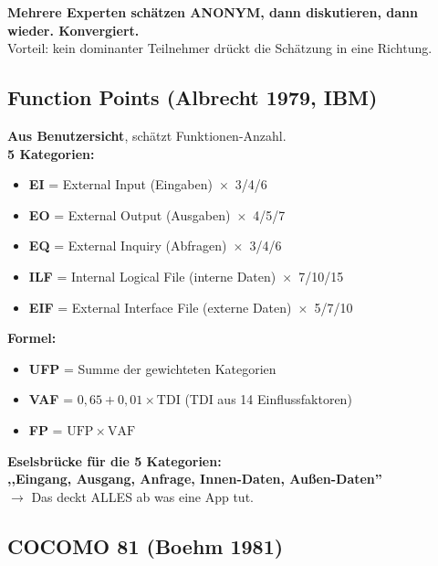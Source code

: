 \documentclass[11pt,a4paper]{article}
\begin{document}
\begin{story}
\textbf{Mehrere Experten schätzen ANONYM, dann diskutieren, dann wieder. Konvergiert.}\\
Vorteil: kein dominanter Teilnehmer drückt die Schätzung in eine Richtung.
\end{story}

\subsection{Function Points (Albrecht 1979, IBM)}

\begin{keyfacts}
\textbf{Aus Benutzersicht}, schätzt Funktionen-Anzahl.\\
\textbf{5 Kategorien:}
\begin{itemize}
  \item \textbf{EI} = External Input (Eingaben) \,$\times$\, 3/4/6
  \item \textbf{EO} = External Output (Ausgaben) \,$\times$\, 4/5/7
  \item \textbf{EQ} = External Inquiry (Abfragen) \,$\times$\, 3/4/6
  \item \textbf{ILF} = Internal Logical File (interne Daten) \,$\times$\, 7/10/15
  \item \textbf{EIF} = External Interface File (externe Daten) \,$\times$\, 5/7/10
\end{itemize}
\textbf{Formel:}
\begin{itemize}
  \item \textbf{UFP} = Summe der gewichteten Kategorien
  \item \textbf{VAF} = $0{,}65 + 0{,}01 \times \mathrm{TDI}$ (TDI aus 14 Einflussfaktoren)
  \item \textbf{FP} = $\mathrm{UFP} \times \mathrm{VAF}$
\end{itemize}
\end{keyfacts}

\begin{merkhilfe}
\textbf{Eselsbrücke für die 5 Kategorien:}\\
\textbf{,,Eingang, Ausgang, Anfrage, Innen-Daten, Außen-Daten''}\\
$\rightarrow$ Das deckt ALLES ab was eine App tut.
\end{merkhilfe}

\subsection{COCOMO 81 (Boehm 1981)}
\end{document}

